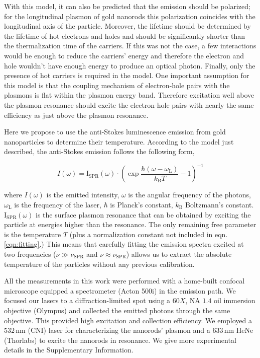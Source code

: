 \documentclass[journal=nalefd,manuscript=letter]{achemso}
\newcommand{\nm}{\ensuremath{\,\textrm{nm}}}
\begin{document}
With this model, it can also be predicted that the emission should be polarized;
for the longitudinal plasmon of gold nanorods this polarization coincides with
the longitudinal axis of the particle\cite{He2015}. Moreover, the lifetime
should be determined by the lifetime of hot electrons and holes and should be
significantly shorter than the thermalization time of the carriers. If this was
not the case, a few interactions would be enough to reduce the carriers' energy
and therefore the electron and hole wouldn't have enough energy to produce an
optical photon. Finally, only the presence of hot carriers is required in the
model. One important assumption for this model is that the coupling 
mechanism of electron-hole pairs with the plasmons is flat within the plasmon 
energy band. Therefore excitation well above the plasmon resonance should excite the 
electron-hole pairs with nearly the same efficiency as just above the plasmon
resonance\cite{Cheng2015}. 

Here we propose to use the anti-Stokes luminescence emission from gold
nanoparticles to determine their temperature. According to the model just
described, the anti-Stokes emission follows the following form,

\begin{equation}\label{eqn:fitting}
	I(\omega) =
	\textrm{I}_{\textrm{SPR}}(\omega)\cdot\left(\exp\frac{\hbar(\omega-\omega_\textrm{L})}{k_\textrm{B}T}-1\right)^{-1}
\end{equation}

\noindent where $I(\omega) $ is the emitted intensity, $\omega$ is the angular frequency
of the photons, $\omega_\textrm{L}$ is the frequency of the laser, $\hbar$ is
Planck's constant, $k_\textrm{B}$ Boltzmann's constant.
$\textrm{I}_{\textrm{SPR}}(\omega) $ is the surface plasmon resonance that can be
obtained by exciting the particle at energies higher than the resonance. The
only remaining free parameter is the temperature $T$ (plus a normalization
constant not included in eqn. \ref{eqn:fitting}.) This means that carefully
fitting the emission spectra excited at two frequencies
($\nu\gg\nu_{\textrm{SPR}}$ and $\nu\approx\nu_{\textrm{SPR}}$) allows us to
extract the absolute temperature of the particles without any previous
calibration.



All the measurements in this work were performed with a home-built confocal
microscope equipped a spectrometer (Acton 500i) in the emission path.  We focused
our lasers to a diffraction-limited spot using a $60X$, NA $1.4$ oil immersion
objective (Olympus) and collected the emitted photons through the same
objective. This provided high excitation and collection efficiency.
We employed a $532\nm$ (CNI) laser for characterizing the nanorods' plasmon and
a $633\nm$ HeNe (Thorlabs) to excite the nanorods in resonance.
We give more experimental details in the Supplementary Information.
\end{document}
